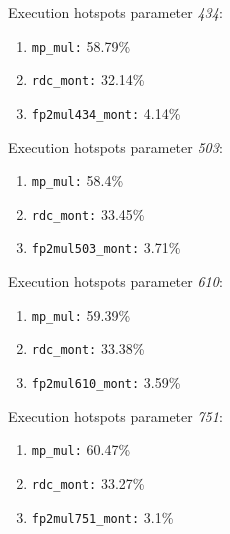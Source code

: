 Execution hotspots parameter \textit{434}:
\begin{enumerate}[noitemsep]
	\item \texttt{mp\_mul:} 58.79\%
	\item \texttt{rdc\_mont:} 32.14\%
	\item \texttt{fp2mul434\_mont:} 4.14\%
\end{enumerate}
Execution hotspots parameter \textit{503}:
\begin{enumerate}[noitemsep]
	\item \texttt{mp\_mul:} 58.4\%
	\item \texttt{rdc\_mont:} 33.45\%
	\item \texttt{fp2mul503\_mont:} 3.71\%
\end{enumerate}
Execution hotspots parameter \textit{610}:
\begin{enumerate}[noitemsep]
	\item \texttt{mp\_mul:} 59.39\%
	\item \texttt{rdc\_mont:} 33.38\%
	\item \texttt{fp2mul610\_mont:} 3.59\%
\end{enumerate}
Execution hotspots parameter \textit{751}:
\begin{enumerate}[noitemsep]
	\item \texttt{mp\_mul:} 60.47\%
	\item \texttt{rdc\_mont:} 33.27\%
	\item \texttt{fp2mul751\_mont:} 3.1\%
\end{enumerate}
